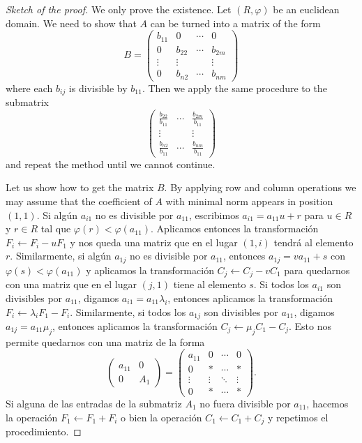 \begin{proof}[Sketch of the proof]
	We only prove the existence. Let $(R,\varphi)$ be an euclidean domain.  
	We need to show that $A$ can be turned into a matrix of the form 
\begin{equation*}
B=\begin{pmatrix}
	b_{11} & 0 & \cdots & 0\\
	0 & b_{22} & \cdots & b_{2m}\\
	\vdots & \vdots &&  \vdots\\
	0 & b_{n2} & \cdots & b_{nm}
\end{pmatrix}
\end{equation*}
where each  $b_{ij}$ is divisible by $b_{11}$. Then we apply the same procedure
to the submatrix 
\[
\begin{pmatrix}
	\frac{b_{22}}{b_{11}} & \cdots & \frac{b_{2m}}{b_{11}}\\
	\vdots & &\vdots \\
	\frac{b_{n2}}{b_{11}} & \cdots & \frac{b_{nm}}{b_{11}}
\end{pmatrix}
\]
and repeat the method until we cannot continue. 

Let us show how to get the matrix $B$. 
By applying row and column operations we may assume that the coefficient of $A$ 
with minimal norm appears in position
$(1,1)$.  
Si algún $a_{i1}$ no es divisible por $a_{11}$, escribimos  
$a_{i1}=a_{11}u+r$ para $u\in R$ y $r\in R$ tal que $\varphi(r)<\varphi(a_{11})$. Aplicamos entonces la transformación
$F_i\leftarrow F_i-uF_1$ y nos queda una matriz
que en el lugar $(1,i)$ tendrá al elemento $r$. Similarmente, si algún $a_{1j}$
no es divisible por $a_{11}$, entonces $a_{1j}=va_{11}+s$ con $\varphi(s)<\varphi(a_{11})$ y 
aplicamos la transformación $C_j\leftarrow C_j-vC_1$ para quedarnos con una matriz que en el lugar 
$(j,1)$ tiene al elemento $s$.  
Si todos los $a_{i1}$ son divisibles por $a_{11}$, digamos $a_{i1}=a_{11}\lambda_i$, entonces
aplicamos la transformación $F_i\leftarrow \lambda_i F_1-F_i$. Similarmente, si todos los
$a_{1j}$ son divisibles por $a_{11}$, digamos $a_{1j}=a_{11}\mu_j$, entonces aplicamos
la transformación $C_j\leftarrow \mu_j C_1-C_j$. Esto nos permite quedarnos con una matriz
de la forma
\[
\begin{pmatrix}
	a_{11} & 0\\
	0 & A_1
\end{pmatrix}
=\begin{pmatrix}
	a_{11} & 0 & \cdots & 0\\
	0 & * & \cdots & *\\
	\vdots & \vdots & \ddots & \vdots \\
	0 & * & \cdots & *
\end{pmatrix}.
\]
Si alguna de las entradas de la submatriz $A_1$ no fuera divisible por $a_{11}$, hacemos la operación
$F_1\leftarrow F_1+F_i$ o bien la operación $C_1\leftarrow C_1+C_j$ y repetimos
el procedimiento.
\end{proof}

